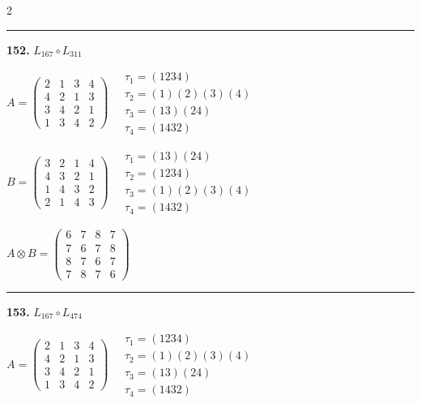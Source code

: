 \begin{multicols}{2}
\vspace{0.3em}
\hrule
\vspace{0.3em}

\noindent\textbf{152.} $L_{167} \circ L_{311}$

$A = \begin{pmatrix} 2 & 1 & 3 & 4 \\ 4 & 2 & 1 & 3 \\ 3 & 4 & 2 & 1 \\ 1 & 3 & 4 & 2 \end{pmatrix} \quad \begin{matrix} \tau_{1}=(1 2 3 4) \\ \tau_{2}=(1)(2)(3)(4) \\ \tau_{3}=(1 3)(2 4) \\ \tau_{4}=(1 4 3 2) \end{matrix}$

$B = \begin{pmatrix} 3 & 2 & 1 & 4 \\ 4 & 3 & 2 & 1 \\ 1 & 4 & 3 & 2 \\ 2 & 1 & 4 & 3 \end{pmatrix} \quad \begin{matrix} \tau_{1}=(1 3)(2 4) \\ \tau_{2}=(1 2 3 4) \\ \tau_{3}=(1)(2)(3)(4) \\ \tau_{4}=(1 4 3 2) \end{matrix}$

$A \otimes B = \begin{pmatrix} 6 & 7 & 8 & 7 \\ 7 & 6 & 7 & 8 \\ 8 & 7 & 6 & 7 \\ 7 & 8 & 7 & 6 \end{pmatrix}$

\vspace{0.3em}
\hrule
\vspace{0.3em}

\noindent\textbf{153.} $L_{167} \circ L_{474}$

$A = \begin{pmatrix} 2 & 1 & 3 & 4 \\ 4 & 2 & 1 & 3 \\ 3 & 4 & 2 & 1 \\ 1 & 3 & 4 & 2 \end{pmatrix} \quad \begin{matrix} \tau_{1}=(1 2 3 4) \\ \tau_{2}=(1)(2)(3)(4) \\ \tau_{3}=(1 3)(2 4) \\ \tau_{4}=(1 4 3 2) \end{matrix}$


\end{multicols}
